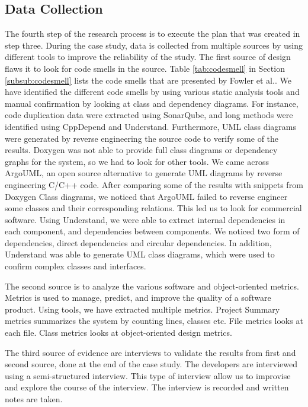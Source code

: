 \subsection{Data Collection}
The fourth step of the research process is to execute the plan that was created in step three. During the case study, data is collected from multiple sources by using different tools to improve the reliability of the study. The first source of design flaws it to look for code smells in the source. Table \ref{tab:codesmell} in Section \ref{subsub:codesmell} lists the code smells that are presented by Fowler et al.\cite{fowler1999refactoring}. We have identified the different code smells by using various static analysis tools and manual confirmation by looking at class and dependency diagrams. For instance, code duplication data were extracted using SonarQube, and long methods were identified using CppDepend and Understand. Furthermore, UML class diagrams were generated by reverse engineering the source code to verify some of the results. Doxygen was not able to provide full class diagrams or dependency graphs for the system, so we had to look for other tools. We came across ArgoUML, an open source alternative to generate UML diagrams by reverse engineering C/C++ code. After comparing some of the results with snippets from Doxygen Class diagrams, we noticed that ArgoUML failed to reverse engineer some classes and their corresponding relations. This led us to look for commercial software. Using Understand, we were able to extract internal dependencies in each component, and dependencies between components. We noticed two form of dependencies, direct dependencies and circular dependencies. In addition, Understand was able to generate UML class diagrams, which were used to confirm complex classes and interfaces. 





The second source is to analyze the various software and object-oriented metrics. Metrics is used to manage, predict, and improve the quality of a software product\cite{rodriguez2001overview}. Using tools, we have extracted multiple metrics. Project Summary metrics summarizes the system by counting lines, classes etc. File metrics looks at each file. Class metrics looks at object-oriented design metrics. 


The third source of evidence are interviews to validate the results from first and second source, done at the end of the case study. The developers are interviewed using a semi-structured interview. This type of interview allow us to improvise and explore the course of the interview. The interview is recorded and written notes are taken.




